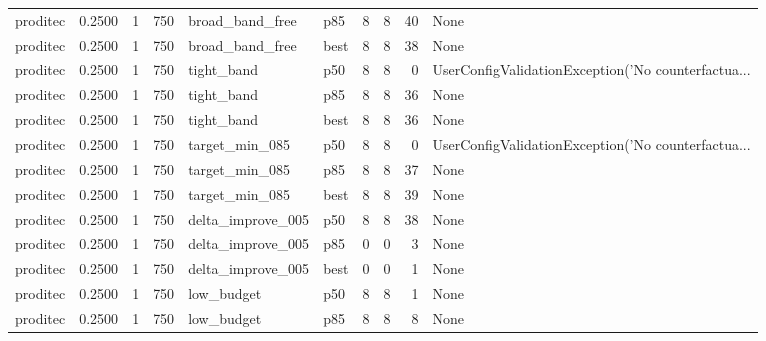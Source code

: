 \begin{tabular}{lrrrllrrrl}
proditec &    0.2500 &    1 &    750 &      broad\_band\_free &    p85 &               8 &          8 &      40 &                                               None \\
proditec &    0.2500 &    1 &    750 &      broad\_band\_free &   best &               8 &          8 &      38 &                                               None \\
proditec &    0.2500 &    1 &    750 &           tight\_band &    p50 &               8 &          8 &       0 & UserConfigValidationException('No counterfactua... \\
proditec &    0.2500 &    1 &    750 &           tight\_band &    p85 &               8 &          8 &      36 &                                               None \\
proditec &    0.2500 &    1 &    750 &           tight\_band &   best &               8 &          8 &      36 &                                               None \\
proditec &    0.2500 &    1 &    750 &       target\_min\_085 &    p50 &               8 &          8 &       0 & UserConfigValidationException('No counterfactua... \\
proditec &    0.2500 &    1 &    750 &       target\_min\_085 &    p85 &               8 &          8 &      37 &                                               None \\
proditec &    0.2500 &    1 &    750 &       target\_min\_085 &   best &               8 &          8 &      39 &                                               None \\
proditec &    0.2500 &    1 &    750 &    delta\_improve\_005 &    p50 &               8 &          8 &      38 &                                               None \\
proditec &    0.2500 &    1 &    750 &    delta\_improve\_005 &    p85 &               0 &          0 &       3 &                                               None \\
proditec &    0.2500 &    1 &    750 &    delta\_improve\_005 &   best &               0 &          0 &       1 &                                               None \\
proditec &    0.2500 &    1 &    750 &           low\_budget &    p50 &               8 &          8 &       1 &                                               None \\
proditec &    0.2500 &    1 &    750 &           low\_budget &    p85 &               8 &          8 &       8 &                                               None \\

\end{tabular}
